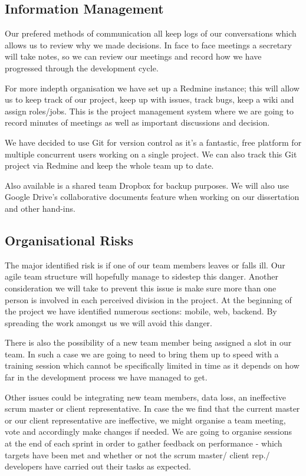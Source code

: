 \documentclass{l3proj}
\begin{document}
\subsection{Information Management}Our prefered methods of communication all keep logs of our conversations which allows us to review why we made decisions. In face to face meetings a secretary will take notes, so we can review our meetings and record how we have progressed through the development cycle. 

For more indepth organisation we have set up a Redmine instance; this will allow us to keep track of our project, keep up with issues, track bugs, keep a wiki and assign roles/jobs. This is the project management system where we are going to record minutes of meetings as well as important discussions and decision.

We have decided to use Git for version control as it’s a fantastic, free platform for multiple concurrent users working on a single project. We can also track this Git project via Redmine and keep the whole team up to date.

Also available is a shared team Dropbox for backup purposes. We will also use Google Drive’s collaborative documents feature when working on our dissertation and other hand-ins.

\subsection{Organisational Risks}The major identified risk is if one of our team members leaves or falls ill. Our agile team structure will hopefully manage to sidestep this danger. Another consideration we will take to prevent this issue is make sure more than one person is involved in each perceived division in the project. At the beginning of the project we have identified numerous sections: mobile, web, backend. By spreading the work amongst us we will avoid this danger.

There is also the possibility of a new team member being assigned a slot in our team. In such a case we are going to need to bring them up to speed with a training session which cannot be specifically limited in time as it depends on how far in the development process we have managed to get.

Other issues could be integrating new team members, data loss, an ineffective scrum master or client representative. In case the we find that the current master or our client representative are ineffective, we might organise a team meeting, vote and accordingly make changes if needed. We are going to organise sessions at the end of each sprint in order to gather feedback on performance - which targets have been met and whether or not the scrum master/ client rep./ developers have carried out their tasks as expected.
\end{document}
